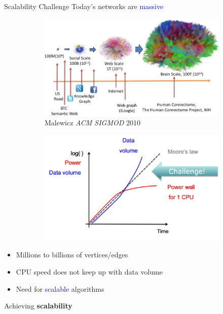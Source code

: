 \documentclass[10pt,titlepage,english,presentation]{beamer}
\newcommand{\emphcolor}{blue}
\renewcommand{\emph}[1]{\textcolor{\emphcolor}{#1}}
\begin{document}
\begin{frame}{Scalability Challenge}
Today's networks are \emph{massive}

\begin{figure}
\begin{subfigure}[t]{.55\textwidth}
\centering
\includegraphics[width=\textwidth]{./images/networks-scale.png}
\caption*{\tiny Malewicz \etal \textit{ACM SIGMOD} 2010}
\end{subfigure}\hfill
\begin{subfigure}[t]{.45\textwidth}
\centering
\includegraphics[width=\textwidth]{./images/scalability-challenge.png}
\end{subfigure}
\end{figure}

\begin{minipage}[t]{.5\textwidth}
\phantom{ }

\begin{itemize}
    \small
    \item Millions to billions of vertices/edges
    \item CPU speed does not keep up with data volume
    \item Need for \emph{scalable} algorithms
\end{itemize}
\end{minipage}\hfill
\begin{minipage}[t]{.5\textwidth}
\pause
Achieving \textbf{scalability}


\end{minipage}
\end{frame}
\end{document}
